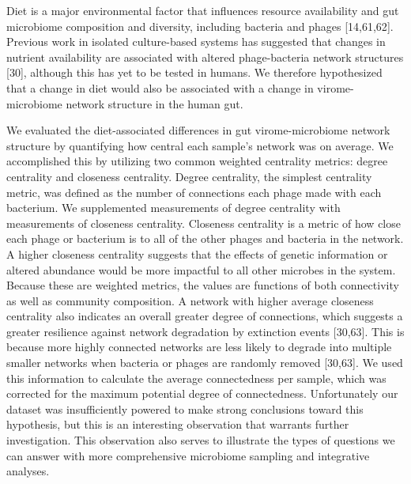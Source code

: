 \documentclass[12pt,]{article}
\begin{document}
Diet is a major environmental factor that influences resource
availability and gut microbiome composition and diversity, including
bacteria and phages {[}14,61,62{]}. Previous work in isolated
culture-based systems has suggested that changes in nutrient
availability are associated with altered phage-bacteria network
structures {[}30{]}, although this has yet to be tested in humans. We
therefore hypothesized that a change in diet would also be associated
with a change in virome-microbiome network structure in the human gut.

We evaluated the diet-associated differences in gut virome-microbiome
network structure by quantifying how central each sample's network was
on average. We accomplished this by utilizing two common weighted
centrality metrics: degree centrality and closeness centrality. Degree
centrality, the simplest centrality metric, was defined as the number of
connections each phage made with each bacterium. We supplemented
measurements of degree centrality with measurements of closeness
centrality. Closeness centrality is a metric of how close each phage or
bacterium is to all of the other phages and bacteria in the network. A
higher closeness centrality suggests that the effects of genetic
information or altered abundance would be more impactful to all other
microbes in the system. Because these are weighted metrics, the values
are functions of both connectivity as well as community composition. A
network with higher average closeness centrality also indicates an
overall greater degree of connections, which suggests a greater
resilience against network degradation by extinction events {[}30,63{]}.
This is because more highly connected networks are less likely to
degrade into multiple smaller networks when bacteria or phages are
randomly removed {[}30,63{]}. We used this information to calculate the
average connectedness per sample, which was corrected for the maximum
potential degree of connectedness. Unfortunately our dataset was
insufficiently powered to make strong conclusions toward this
hypothesis, but this is an interesting observation that warrants further
investigation. This observation also serves to illustrate the types of
questions we can answer with more comprehensive microbiome sampling and
integrative analyses.
\end{document}
